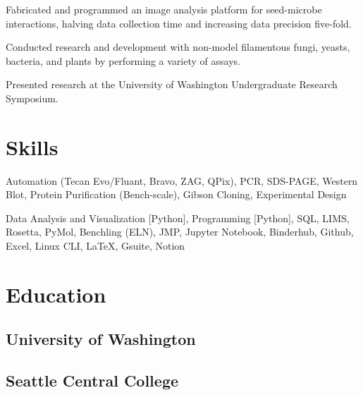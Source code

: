 \documentclass[]{forrest-resume-interfont}
\begin{document}
\begin{tightemize}
    \item Fabricated and programmed an image analysis platform for seed-microbe interactions, halving data collection time and increasing data precision five-fold.
    \item Conducted research and development with non-model filamentous fungi, yeasts, bacteria, and plants by performing a variety of assays.
    \item Presented research at the University of Washington Undergraduate Research Symposium.
\end{tightemize}

\linesep

\section{ Skills}
Automation (Tecan Evo/Fluant, Bravo, ZAG, QPix),
PCR,
SDS-PAGE,
Western Blot,
Protein Purification (Bench-scale),
Gibson Cloning,
Experimental Design

\spacesep

Data Analysis and Visualization [Python],
Programming [Python],
SQL,
LIMS,
Rosetta,
PyMol,
Benchling (ELN),
JMP,
Jupyter Notebook,
Binderhub,
Github,
Excel,
Linux CLI,
LaTeX,
Gsuite,
Notion

\linesep


\section{ Education}
\subsection{University of Washington}
\spacesep
\subsection{Seattle Central College}

\vfill

\noindent\makebox[\linewidth]{\color{black}\rule{\paperwidth}{0.4pt}}
\end{document}
